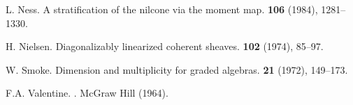 \documentclass{article}
\begin{document}
\begin{thebibliography}{25}
  {L. Ness.}
  \newblock A stratification of the nilcone via the moment map.
   \textbf{106} (1984), 1281--1330.

  {H. Nielsen.}
  \newblock Diagonalizably linearized coherent sheaves.
   \textbf{102} (1974), 85--97.

  {W. Smoke.}
  \newblock Dimension and multiplicity for graded algebras.
   \textbf{21} (1972), 149--173.

  {F.A. Valentine.}
  .
  \newblock McGraw Hill (1964).

\end{thebibliography}
\end{document}
